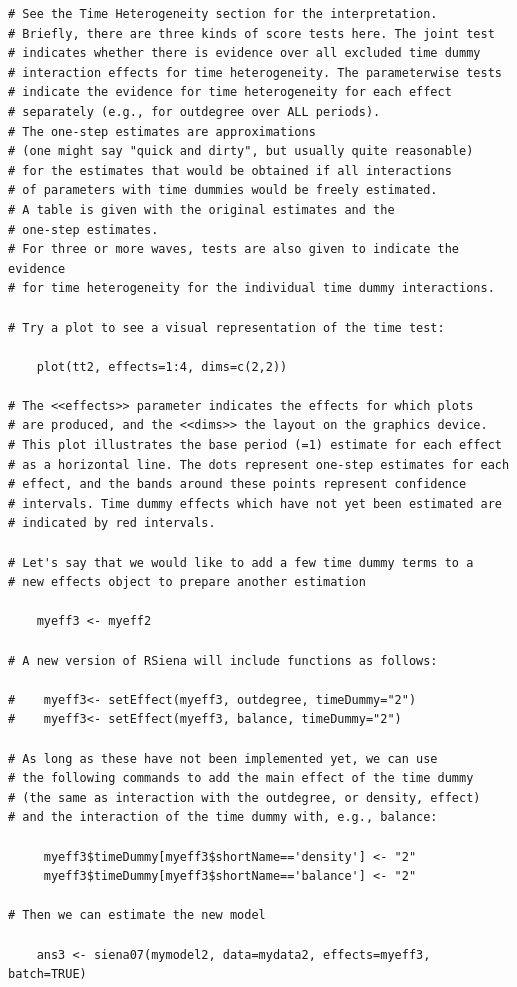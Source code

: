 \documentclass[a4paper,fleqn]{article}
\newcommand{\+}{\, + \,}
\begin{document}
{\begin{verbatim}
# See the Time Heterogeneity section for the interpretation.
# Briefly, there are three kinds of score tests here. The joint test
# indicates whether there is evidence over all excluded time dummy
# interaction effects for time heterogeneity. The parameterwise tests
# indicate the evidence for time heterogeneity for each effect
# separately (e.g., for outdegree over ALL periods).
# The one-step estimates are approximations
# (one might say "quick and dirty", but usually quite reasonable)
# for the estimates that would be obtained if all interactions
# of parameters with time dummies would be freely estimated.
# A table is given with the original estimates and the
# one-step estimates.
# For three or more waves, tests are also given to indicate the evidence
# for time heterogeneity for the individual time dummy interactions.

# Try a plot to see a visual representation of the time test:

    plot(tt2, effects=1:4, dims=c(2,2))

# The <<effects>> parameter indicates the effects for which plots
# are produced, and the <<dims>> the layout on the graphics device.
# This plot illustrates the base period (=1) estimate for each effect
# as a horizontal line. The dots represent one-step estimates for each
# effect, and the bands around these points represent confidence
# intervals. Time dummy effects which have not yet been estimated are
# indicated by red intervals.

# Let's say that we would like to add a few time dummy terms to a
# new effects object to prepare another estimation

    myeff3 <- myeff2

# A new version of RSiena will include functions as follows:

#    myeff3<- setEffect(myeff3, outdegree, timeDummy="2")
#    myeff3<- setEffect(myeff3, balance, timeDummy="2")

# As long as these have not been implemented yet, we can use
# the following commands to add the main effect of the time dummy
# (the same as interaction with the outdegree, or density, effect)
# and the interaction of the time dummy with, e.g., balance:

     myeff3$timeDummy[myeff3$shortName=='density'] <- "2"
     myeff3$timeDummy[myeff3$shortName=='balance'] <- "2"

# Then we can estimate the new model

    ans3 <- siena07(mymodel2, data=mydata2, effects=myeff3, batch=TRUE)


\end{verbatim}}
\end{document}
